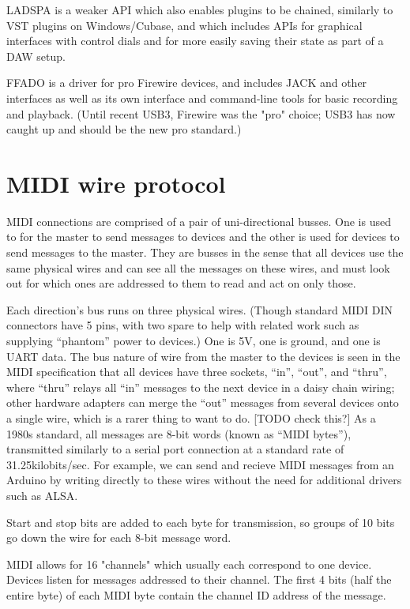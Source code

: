 \documentclass[oneside,english]{scrbook}
\begin{document}
LADSPA is a weaker API which also enables plugins to be chained, similarly to VST plugins on Windows/Cubase, and which includes APIs for graphical interfaces with control dials and for more easily saving their state as part of a DAW setup.

FFADO is a driver for pro Firewire devices, and includes JACK and other interfaces as well as its own interface and command-line tools for basic recording and playback.  (Until recent USB3, Firewire was the "pro" choice; USB3 has now caught up and should be the new pro standard.)

\section{MIDI wire protocol}
MIDI connections are comprised of a pair of uni-directional busses. One is used to for the master to send messages to devices and the other is used for devices to send messages to the master. They are busses in the sense that all devices use the same physical wires and can see all the messages on these wires, and must look out for which ones are addressed to them to read and act on only those.

Each direction's bus runs on three physical wires. (Though standard MIDI DIN connectors have 5 pins, with two spare to help with related work such as supplying “phantom” power to devices.) One is 5V, one is ground, and one is UART data. The bus nature of wire from the master to the devices is seen in the MIDI specification that all devices have three sockets, “in”, “out”, and “thru”, where “thru” relays all “in” messages to the next device in a daisy chain wiring; other hardware adapters can merge the “out” messages from several devices onto a single wire, which is a rarer thing to want to do. [TODO check this?] As a 1980s standard, all messages are 8-bit words (known as “MIDI bytes”), transmitted similarly to a serial port connection at a standard rate of 31.25kilobits/sec.  For example, we can send and recieve MIDI messages from an Arduino by writing directly to these wires without the need for additional drivers such as ALSA.

Start and stop bits are added to each byte for transmission, so groups of 10 bits go down the wire for each 8-bit message word.

MIDI allows for 16 "channels" which usually each correspond to one device. Devices listen for messages addressed to their channel.  The first 4 bits (half the entire byte) of each MIDI byte contain the channel ID address of the message.
\end{document}
